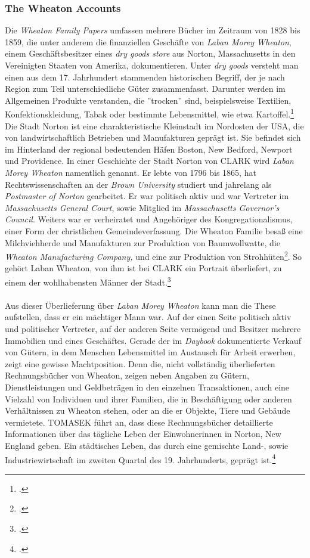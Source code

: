\documentclass[12pt,a4paper]{article}
\begin{document}
\subsubsection{The Wheaton Accounts}

Die \textit{Wheaton Family Papers} umfassen mehrere Bücher im Zeitraum von 1828 bis 1859, die unter anderem die finanziellen Geschäfte von \textit{Laban Morey Wheaton}, einem Geschäftsbesitzer eines \textit{dry goods store} aus Norton, Massachusetts in den Vereinigten Staaten von Amerika, dokumentieren. Unter \textit{dry goods} versteht man einen aus dem 17. Jahrhundert stammenden historischen Begriff, der je nach Region zum Teil unterschiedliche Güter zusammenfasst. Darunter werden im Allgemeinen Produkte verstanden, die ''trocken'' sind, beispielsweise Textilien, Konfektionskleidung, Tabak oder bestimmte Lebensmittel, wie etwa Kartoffel.\footcite[Definition von \textit{Dry Goods}, \protect\url{chestofbooks.com/reference/Dictionary-of-Dry-Goods/Dry-Goods.html}, 23.05.2019,][]{cole2015complete}
\\
Die Stadt Norton ist eine charakteristische Kleinstadt im Nordosten der USA, die von landwirtschaftlich Betrieben und Manufakturen geprägt ist. Sie befindet sich im Hinterland der regional bedeutenden Häfen Boston, New Bedford, Newport und Providence. In einer Geschichte der Stadt Norton von CLARK wird \textit{Laban Morey Wheaton} namentlich genannt. Er lebte von 1796 bis 1865, hat Rechtswissenschaften an der \textit{Brown University} studiert und jahrelang als \textit{Postmaster of Norton} gearbeitet. Er war politisch aktiv und war Vertreter im \textit{Massachusetts General Court}, sowie Mitglied im \textit{Massachusetts Governor's Council}. Weiters war er verheiratet und Angehöriger des Kongregationalismus, einer Form der christlichen Gemeindeverfassung. Die Wheaton Familie besaß eine Milchviehherde und Manufakturen zur Produktion von Baumwollwatte, die \textit{Wheaton Manufacturing Company,} und eine zur Produktion von Strohhüten\footcite[][S.6]{tomasek2013encoding}. So gehört Laban Wheaton, von ihm ist bei CLARK ein Portrait überliefert, zu einem der wohlhabensten Männer der Stadt.\footcite[][S.496]{clark1859history}
\\
\\
Aus dieser Überlieferung über \textit{Laban Morey Wheaton} kann man die These aufstellen, dass er ein mächtiger Mann war. Auf der einen Seite politisch aktiv und politischer Vertreter, auf der anderen Seite vermögend und Besitzer mehrere Immobilien und eines Geschäftes. Gerade der im \textit{Daybook} dokumentierte Verkauf von Gütern, in dem Menschen Lebensmittel im Austausch für Arbeit erwerben, zeigt eine gewisse Machtposition. Denn die, nicht vollständig überlieferten Rechnungsbücher von Wheaton, zeigen neben Angaben zu Gütern, Dienstleistungen und Geldbeträgen in den einzelnen Transaktionen, auch eine Vielzahl von Individuen und ihrer Familien, die in Beschäftigung oder anderen Verhältnissen zu Wheaton stehen, oder an die er Objekte, Tiere und Gebäude vermietete. TOMASEK führt an, dass diese Rechnungsbücher detaillierte Informationen über das tägliche Leben der Einwohnerinnen in Norton, New England geben. Ein städtisches Leben, das durch eine gemischte Land-, sowie Industriewirtschaft im zweiten Quartal des 19. Jahrhunderts, geprägt ist.\footcite[][S.5]{tomasekmedea}
\end{document}
